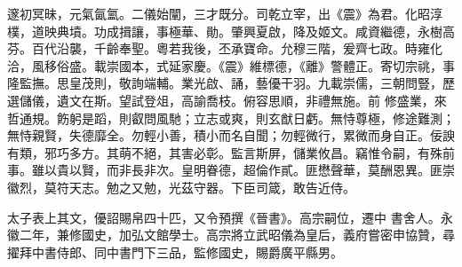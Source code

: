 \begin{pinyinscope}
 邃初冥昧，元氣氤氳。二儀始闡，三才既分。司乾立宰，出《震》為君。化昭淳樸，道映典墳。功成揖讓，事極華、勛。肇興夏啟，降及姬文。咸資繼德，永樹高芬。百代沿襲，千齡奉聖。粵若我後，丕承寶命。允穆三階，爰齊七政。時雍化洽，風移俗盛。載崇國本，式延家慶。《震》維標德，《離》警體正。寄切宗祧，事隆監撫。思皇茂則，敬詢端輔。業光啟、誦，藝優干羽。九載崇儒，三朝問豎，歷選儲儀，遺文在斯。望試登俎，高諭喬枝。俯容思順，非禮無施。前
 修盛業，來哲通規。飭躬是蹈，則叡問風馳；立志或爽，則玄猷日虧。無恃尊極，修途難測；無恃親賢，失德靡全。勿輕小善，積小而名自聞；勿輕微行，累微而身自正。佞諛有類，邪巧多方。其萌不絕，其害必彰。監言斯屏，儲業攸昌。竊惟令嗣，有殊前事。雖以貴以賢，而非長非次。皇明眷德，超倫作貳。匪懋聲華，莫酬恩異。匪崇徽烈，莫符天志。勉之又勉，光茲守器。下臣司箴，敢告近侍。



 太子表上其文，優詔賜帛四十匹，又令預撰《晉書》。高宗嗣位，遷中
 書舍人。永徽二年，兼修國史，加弘文館學士。高宗將立武昭儀為皇后，義府嘗密申協贊，尋擢拜中書侍郎、同中書門下三品，監修國史，賜爵廣平縣男。




\end{pinyinscope}
